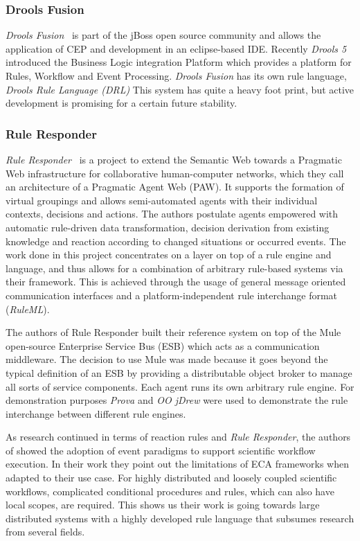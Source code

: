 \subsubsection{Drools Fusion}
\emph{Drools Fusion}~\cite{wwwdrools} is part of the jBoss open source community and allows the application of CEP and development in an eclipse-based IDE. Recently \emph{Drools 5} introduced the Business Logic integration Platform which provides a platform for Rules, Workflow and Event Processing. \emph{Drools Fusion} has its own rule language, \emph{Drools Rule Language (DRL)} This system has quite a heavy foot print, but active development is promising for a certain future stability.

\subsubsection{Rule Responder}
\emph{Rule Responder}~\cite{2007-Paschke_etal-RuleResponder.pdf} is a project to extend the Semantic Web towards a Pragmatic Web infrastructure for collaborative human-computer networks, which they call an architecture of a Pragmatic Agent Web (PAW). It supports the formation of virtual groupings and allows semi-automated agents with their individual contexts, decisions and actions. The authors postulate agents empowered with automatic rule-driven data transformation, decision derivation from existing knowledge and reaction according to changed situations or occurred events. The work done in this project concentrates on a layer on top of a rule engine and language, and thus allows for a combination of arbitrary rule-based systems via their framework. This is achieved through the usage of general message oriented communication interfaces and a platform-independent rule interchange format (\emph{RuleML}).

The authors of Rule Responder built their reference system on top of the Mule open-source Enterprise Service Bus (ESB) which acts as a communication middleware. The decision to use Mule was made because it goes beyond the typical definition of an ESB by providing a distributable object broker to manage all sorts of service components. Each agent runs its own arbitrary rule engine. For demonstration purposes \emph{Prova} and \emph{OO jDrew} were used to demonstrate the rule interchange between different rule engines.

As research continued in terms of reaction rules and \textit{Rule Responder}, the authors of \cite{2013_Zhao-Paschke_EDSWE.pdf} showed the adoption of event paradigms to support scientific workflow execution. In their work they point out the limitations of ECA frameworks when adapted to their use case. For highly distributed and loosely coupled scientific workflows, complicated conditional procedures and rules, which can also have local scopes, are required. This shows us their work is going towards large distributed systems with a highly developed rule language that subsumes research from several fields.



